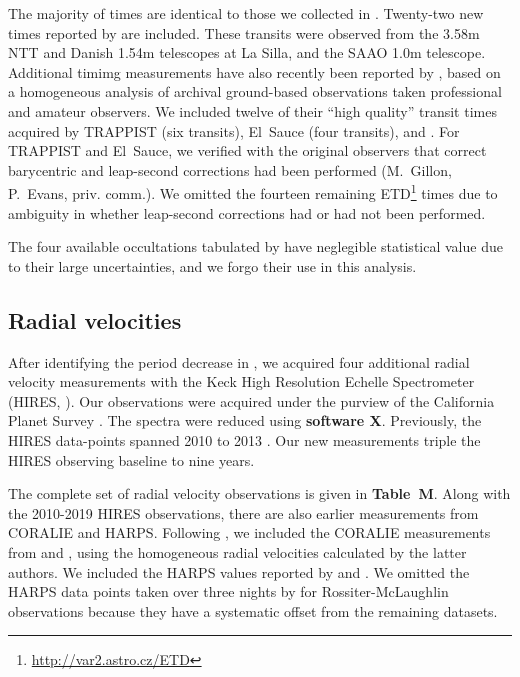 \documentclass[12pt,twocolumn,tighten]{aastex62}
\begin{document}
The majority of times are identical to those we collected in
.  Twenty-two new times reported by
\citet{southworth_transit_2019} are included.  These transits were
observed from the 3.58m NTT and Danish 1.54m telescopes at La Silla,
and the SAAO 1.0m telescope.  Additional timimg
measurements have also recently been reported by \citet{baluev_2019},
based on a homogeneous analysis of archival ground-based observations
taken professional and amateur observers.  We included
twelve of their ``high quality'' transit times acquired by TRAPPIST
(six transits), El~Sauce (four transits), and
\citet{petrucci_no_2013}.  For TRAPPIST and El~Sauce, we verified with
the original observers that correct barycentric and leap-second
corrections had been performed (M.~Gillon, P.~Evans, priv{.} comm{.}).
We omitted the fourteen remaining \citeauthor{baluev_2019}
ETD\footnote{\url{http://var2.astro.cz/ETD}} times due to ambiguity in
whether leap-second corrections had or had not been performed.

The four available occultations tabulated by
 have neglegible statistical value due
to their large uncertainties, and we forgo their use in this analysis.

\subsection{Radial velocities}

After identifying the period decrease in
, we acquired four additional radial
velocity measurements with the Keck High Resolution Echelle
Spectrometer (HIRES, \citealt{vogt_hires_1994}).  Our observations
were acquired under the purview of the California Planet Survey
\citep{howard_cps_2010}.  The spectra were reduced using {\bf software
X}.  Previously, the HIRES data-points spanned 2010 to 2013
\citep{knutson_friends_2014}.  Our new measurements triple the HIRES
observing baseline to nine years.

The complete set of radial velocity observations is given in {\bf
Table~M}.  Along with the 2010-2019 HIRES observations, there are also
earlier measurements from CORALIE and HARPS.  Following
, we included the CORALIE measurements
from \citet{wilson_wasp-4b_2008} and \citet{triaud_spin-orbit_2010},
using the homogeneous radial velocities calculated by the latter
authors. We included the HARPS values reported by
\citet{pont_determining_2011} and \citet{husnoo_observational_2012}.
We omitted the HARPS data points taken over three nights by
\citet{triaud_spin-orbit_2010} for Rossiter-McLaughlin observations
because they have a systematic offset from the remaining datasets.
\end{document}
